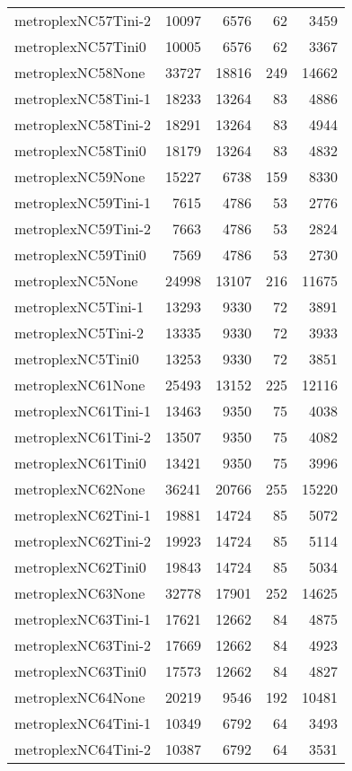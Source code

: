 \begin{longtable}{lrrrr}
metroplexNC57Tini-2 & 10097 & 6576 & 62 & 3459 \\
metroplexNC57Tini0 & 10005 & 6576 & 62 & 3367 \\
metroplexNC58None & 33727 & 18816 & 249 & 14662 \\
metroplexNC58Tini-1 & 18233 & 13264 & 83 & 4886 \\
metroplexNC58Tini-2 & 18291 & 13264 & 83 & 4944 \\
metroplexNC58Tini0 & 18179 & 13264 & 83 & 4832 \\
metroplexNC59None & 15227 & 6738 & 159 & 8330 \\
metroplexNC59Tini-1 & 7615 & 4786 & 53 & 2776 \\
metroplexNC59Tini-2 & 7663 & 4786 & 53 & 2824 \\
metroplexNC59Tini0 & 7569 & 4786 & 53 & 2730 \\
metroplexNC5None & 24998 & 13107 & 216 & 11675 \\
metroplexNC5Tini-1 & 13293 & 9330 & 72 & 3891 \\
metroplexNC5Tini-2 & 13335 & 9330 & 72 & 3933 \\
metroplexNC5Tini0 & 13253 & 9330 & 72 & 3851 \\
metroplexNC61None & 25493 & 13152 & 225 & 12116 \\
metroplexNC61Tini-1 & 13463 & 9350 & 75 & 4038 \\
metroplexNC61Tini-2 & 13507 & 9350 & 75 & 4082 \\
metroplexNC61Tini0 & 13421 & 9350 & 75 & 3996 \\
metroplexNC62None & 36241 & 20766 & 255 & 15220 \\
metroplexNC62Tini-1 & 19881 & 14724 & 85 & 5072 \\
metroplexNC62Tini-2 & 19923 & 14724 & 85 & 5114 \\
metroplexNC62Tini0 & 19843 & 14724 & 85 & 5034 \\
metroplexNC63None & 32778 & 17901 & 252 & 14625 \\
metroplexNC63Tini-1 & 17621 & 12662 & 84 & 4875 \\
metroplexNC63Tini-2 & 17669 & 12662 & 84 & 4923 \\
metroplexNC63Tini0 & 17573 & 12662 & 84 & 4827 \\
metroplexNC64None & 20219 & 9546 & 192 & 10481 \\
metroplexNC64Tini-1 & 10349 & 6792 & 64 & 3493 \\
metroplexNC64Tini-2 & 10387 & 6792 & 64 & 3531 \\

\end{longtable}
